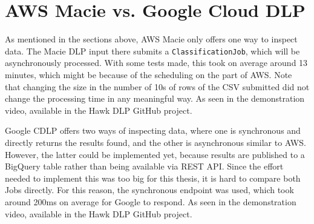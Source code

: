 \section{AWS Macie vs. Google Cloud DLP}
As mentioned in the sections above, AWS Macie only offers one way to inspect data. The Macie DLP input there submits a \texttt{ClassificationJob}, which will be asynchronously processed. With some tests made, this took on average around 13 minutes, which might be because of the scheduling on the part of AWS. Note that changing the size in the number of 10s of rows of the CSV submitted did not change the processing time in any meaningful way. As seen in the demonstration video, available in the Hawk DLP GitHub project.


Google CDLP offers two ways of inspecting data, where one is synchronous and directly returns the results found, and the other is asynchronous similar to AWS. However, the latter could be implemented yet, because results are published to a BigQuery table rather than being available via REST API. Since the effort needed to implement this was too big for this thesis, it is hard to compare both Jobs directly. For this reason, the synchronous endpoint was used, which took around 200ms on average for Google to respond. As seen in the demonstration video, available in the Hawk DLP GitHub project.

